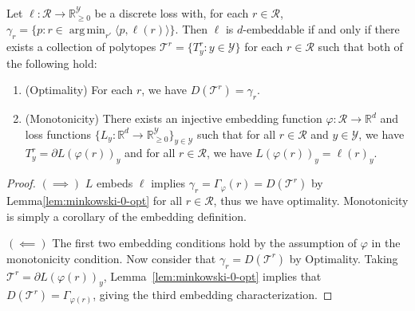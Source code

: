 \documentclass[anon]{colt2020} %
\newcommand{\reals}{\mathbb{R}}
\newcommand{\simplex}{\Delta_\Y}
\newcommand{\R}{\mathcal{R}}
\newcommand{\T}{\mathcal{T}}
\newcommand{\Y}{\mathcal{Y}}
\newcommand{\inprod}[2]{\langle #1, #2 \rangle}%
\DeclareMathOperator*{\argmin}{arg\,min}
\begin{document}
\begin{theorem} \label{thm:general-char}
  Let $\ell: \R \to \reals_{\geq 0}^{\Y}$ be a discrete loss with, for each $r \in \R$, $\gamma_r = \{p : r \in \argmin_{r'} \inprod{p}{\ell(r)}\}$.
  Then $\ell$ is $d$-embeddable if and only if there exists a collection of polytopes $\T^r = \{T^r_y : y \in \Y\}$ for each $r \in \R$ such that both of the following hold:
  \begin{enumerate}
    \item (Optimality) For each $r$, we have $D(\T^r) = \gamma_r$.
    \item (Monotonicity) There exists an injective embedding function $\varphi : \R \to \reals^d$ and loss functions $\{L_y : \reals^d \to \reals^\Y_{\geq 0}\}_{y \in \Y}$ such that for all $r \in \R$ and $y \in \Y$, we have $T^r_y = \partial L(\varphi(r))_y$ and for all $r \in \R$, we have $L(\varphi(r))_y = \ell(r)_y$.
  \end{enumerate}
\end{theorem}
\begin{proof}
  $(\implies)$ 
$L$ embeds $\ell$ implies $\gamma_{r} = \Gamma_\varphi(r) = D(\T^r)$ by Lemma\ref{lem:minkowski-0-opt} for all $r \in \R$, thus we have optimality.
Monotonicity is simply a corollary of the embedding definition. 
  
  $(\impliedby)$ The first two embedding conditions hold by the assumption of $\varphi$ in the monotonicity condition.
  Now consider that $\gamma_r = D(\T^r)$ by Optimality. 
  Taking $\T^r = \partial L(\varphi(r))_y$, Lemma~\ref{lem:minkowski-0-opt} implies that $D(\T^r) = \Gamma_{\varphi(r)}$, giving the third embedding characterization.
\end{proof}
\end{document}
